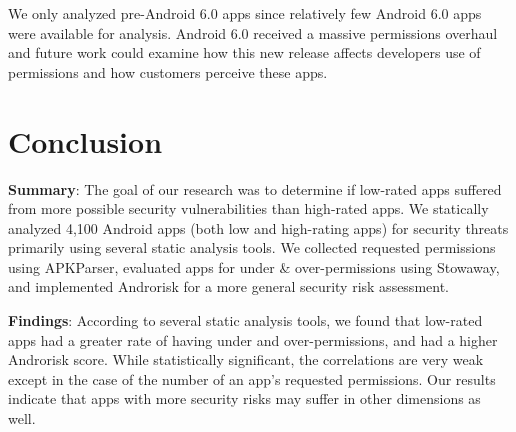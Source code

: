 \documentclass{sig-alternate-05-2015}
\newcommand{\todo}[1]{\textcolor{cyan}{\textbf{[#1]}}}
\begin{document}


We only analyzed pre-Android 6.0 apps since relatively few Android 6.0 apps were available for analysis. Android 6.0 received a massive permissions overhaul and future work could examine how this new release affects developers use of permissions and how customers perceive these apps.




\section{Conclusion}
\label{sec:conclusion}

\noindent \textbf{Summary}:
The goal of our research was to determine if low-rated apps suffered from more possible security vulnerabilities than high-rated apps. We statically analyzed 4,100 Android apps (both low and high-rating apps) for security threats primarily using several static analysis tools. We collected requested permissions using APKParser, evaluated apps for under \& over-permissions using Stowaway, and implemented Androrisk for a more general security risk assessment.

\noindent \textbf{Findings}: According to several static analysis tools, we found that low-rated apps had a greater rate of having under and over-permissions, and had a higher Androrisk score. While statistically significant, the correlations are very weak except in the case of the number of an app's requested permissions. Our results indicate that apps with more security risks may suffer in other dimensions as well.





\end{document}
